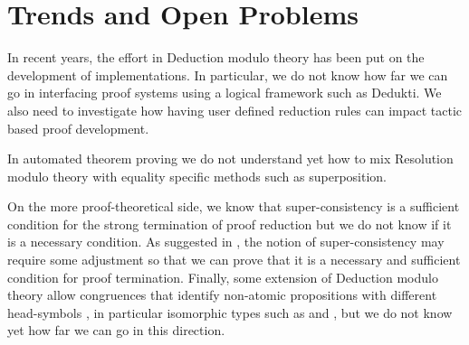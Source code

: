 \documentclass{llncs}
\begin{document}
\section{Trends and Open Problems}

In recent years, the effort in Deduction modulo theory has been put on the
development of implementations. In particular, we do not know how far we can 
go in interfacing proof systems using a logical framework such as Dedukti.
We also need to investigate how having user defined reduction rules can 
impact tactic based proof development.

In automated theorem proving we do not understand yet how to mix Resolution
modulo theory with equality specific methods such as superposition.

On the more proof-theoretical side, we know that super-consistency is
a sufficient condition for the strong termination of proof reduction
but we do not know if it is a necessary condition. As suggested in
\cite{Cousineau}, the notion of super-consistency may require some
adjustment so that we can prove that it is a necessary and sufficient
condition for proof termination.
Finally, some extension of Deduction modulo theory
allow congruences that identify non-atomic propositions with different 
head-symbols \cite{DD}, in particular isomorphic types such as 
 and ,
but we do not know yet how far we can go in this direction.
\end{document}
